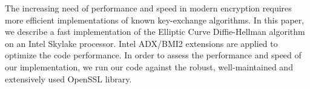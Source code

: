 The increasing need of performance and speed in modern encryption requires more efficient implementations of known key-exchange algorithms. In this paper, we describe a fast implementation of the Elliptic Curve Diffie-Hellman algorithm on an Intel Skylake processor. Intel ADX/BMI2 extensions are applied to optimize the code performance. In order to assess the performance and speed of our implementation, we run our code against the robust, well-maintained and extensively used OpenSSL library.